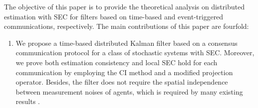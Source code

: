 \documentclass[journal,transmag]{IEEEtran}
\begin{document}
	
	The objective of this paper is to provide the theoretical analysis on  distributed estimation  with SEC for filters based on time-based and event-triggered communications, respectively.
	The main contributions of this paper are fourfold:
	\begin{enumerate}
		\item 
		We propose a time-based distributed Kalman filter based on a consensus communication protocol for a class of stochastic systems with SEC. 
		Moreover, we prove  both  estimation consistency and local SEC  hold for each communication by employing the CI method and a modified projection operator. 
		Besides, 
		the filter does not require the spatial independence between  measurement noises of agents, which is required by many existing results  \cite{Dm2015Distributed,Cat2010Diffusion,wang2017convergence,olfati2009kalman}.
		
	
		
		
		
		
%		
		
%		
%
%	
%	
	

\end{enumerate}
\end{document}
